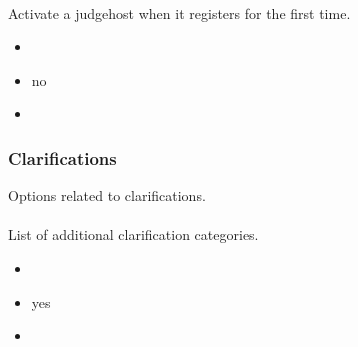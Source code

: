 \documentclass[a4paper,10pt,english,openany]{sphinxmanual}
\begin{document}
\paragraph{}
\label{\detokenize{configuration-reference:judgehost-activated-by-default}}
\sphinxAtStartPar
Activate a judgehost when it registers for the first time.
\begin{itemize}
\item {} 
\sphinxAtStartPar
{} 

\item {} 
\sphinxAtStartPar
{} no

\item {} 
\sphinxAtStartPar
{} 

\end{itemize}


\subsubsection{Clarifications}
\label{\detokenize{configuration-reference:clarifications}}
\sphinxAtStartPar
Options related to clarifications.


\paragraph{}
\label{\detokenize{configuration-reference:clar-categories}}
\sphinxAtStartPar
List of additional clarification categories.
\begin{itemize}
\item {} 
\sphinxAtStartPar
{} 

\item {} 
\sphinxAtStartPar
{} yes

\item {} 
\sphinxAtStartPar
{}

\begin{sphinxVerbatim}[commandchars=\\\{\}]
\end{sphinxVerbatim}

\end{itemize}
\end{document}
